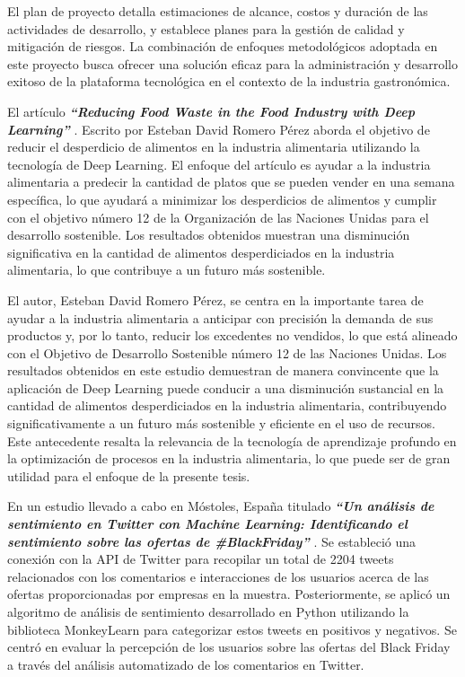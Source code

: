 \vspace{1\baselineskip}
El plan de proyecto detalla estimaciones de alcance, costos y duración de las actividades de desarrollo, y establece planes para la gestión de calidad y mitigación de riesgos. La combinación de enfoques metodológicos adoptada en este proyecto busca ofrecer una solución eficaz para la administración y desarrollo exitoso de la plataforma tecnológica en el contexto de la industria gastronómica.

\vspace{1\baselineskip}
El artículo \textbf{\textit{ “Reducing Food Waste in the Food Industry with Deep Learning” }}\cite{afanador2022diseno}. Escrito por Esteban David Romero Pérez aborda el objetivo de reducir el desperdicio de alimentos en la industria alimentaria utilizando la tecnología de Deep Learning. El enfoque del artículo es ayudar a la industria alimentaria a predecir la cantidad de platos que se pueden vender en una semana específica, lo que ayudará a minimizar los desperdicios de alimentos y cumplir con el objetivo número 12 de la Organización de las Naciones Unidas para el desarrollo sostenible. Los resultados obtenidos muestran una disminución significativa en la cantidad de alimentos desperdiciados en la industria alimentaria, lo que contribuye a un futuro más sostenible.

\vspace{1\baselineskip}
El autor, Esteban David Romero Pérez, se centra en la importante tarea de ayudar a la industria alimentaria a anticipar con precisión la demanda de sus productos y, por lo tanto, reducir los excedentes no vendidos, lo que está alineado con el Objetivo de Desarrollo Sostenible número 12 de las Naciones Unidas. Los resultados obtenidos en este estudio demuestran de manera convincente que la aplicación de Deep Learning puede conducir a una disminución sustancial en la cantidad de alimentos desperdiciados en la industria alimentaria, contribuyendo significativamente a un futuro más sostenible y eficiente en el uso de recursos. Este antecedente resalta la relevancia de la tecnología de aprendizaje profundo en la optimización de procesos en la industria alimentaria, lo que puede ser de gran utilidad para el enfoque de la presente tesis.

\vspace{1\baselineskip}
En un estudio llevado a cabo en Móstoles, España titulado \textbf{\textit{“Un análisis de sentimiento en Twitter con Machine Learning: Identificando el sentimiento sobre las ofertas de \#BlackFriday” }}\cite{saura2018analisis}. Se estableció una conexión con la API de Twitter para recopilar un total de 2204 tweets relacionados con los comentarios e interacciones de los usuarios acerca de las ofertas proporcionadas por empresas en la muestra. Posteriormente, se aplicó un algoritmo de análisis de sentimiento desarrollado en Python utilizando la biblioteca MonkeyLearn para categorizar estos tweets en positivos y negativos. Se centró en evaluar la percepción de los usuarios sobre las ofertas del Black Friday a través del análisis automatizado de los comentarios en Twitter.

